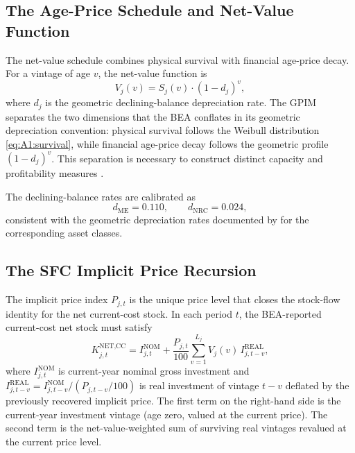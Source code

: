 \subsection{The Age-Price Schedule and Net-Value Function}
\label{app:A1:ageprice}

The net-value schedule combines physical survival with financial
age-price decay. For a vintage of age $v$, the net-value function
is
\begin{equation}
	V_j(v) = S_j(v) \cdot (1 - d_j)^v,
	\label{eq:A1:netvalue}
\end{equation}
where $d_j$ is the geometric declining-balance depreciation rate.
The GPIM separates the two dimensions that the BEA conflates in
its geometric depreciation convention: physical survival follows
the Weibull distribution \eqref{eq:A1:survival}, while financial
age-price decay follows the geometric profile $(1-d_j)^v$. This
separation is necessary to construct distinct capacity and
profitability measures \citep[App.~6.3]{Shaikh2016}.

The declining-balance rates are calibrated as
\begin{equation}
	d_{\text{ME}} = 0.110, \qquad d_{\text{NRC}} = 0.024,
	\label{eq:A1:calibration_decay}
\end{equation}
consistent with the geometric depreciation rates documented by
\citet{Fraumeni1997} for the corresponding asset classes.

\subsection{The SFC Implicit Price Recursion}
\label{app:A1:sfc_recursion}

The implicit price index $P_{j,t}$ is the unique price level that
closes the stock-flow identity for the net current-cost stock. In
each period $t$, the BEA-reported current-cost net stock must
satisfy
\begin{equation}
	K^{\text{NET,CC}}_{j,t}
	= I^{\text{NOM}}_{j,t}
	+ \frac{P_{j,t}}{100}
	\sum_{v=1}^{L_j} V_j(v)\, I^{\text{REAL}}_{j,t-v},
	\label{eq:A1:sfc_identity}
\end{equation}
where $I^{\text{NOM}}_{j,t}$ is current-year nominal gross
investment and $I^{\text{REAL}}_{j,t-v} = I^{\text{NOM}}_{j,t-v}
/ (P_{j,t-v}/100)$ is real investment of vintage $t-v$ deflated
by the previously recovered implicit price. The first term on the
right-hand side is the current-year investment vintage (age zero,
valued at the current price). The second term is the net-value-weighted
sum of surviving real vintages revalued at the current price level.

